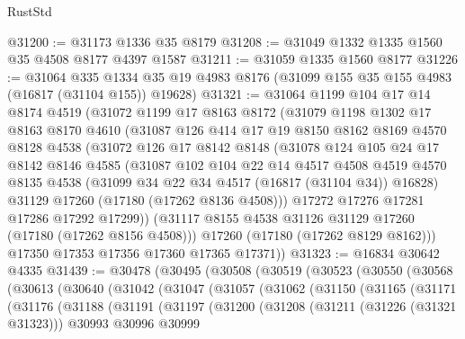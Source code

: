 \begin{lexlean}{RustStd}
\begin{coremodule}
{\begin{coremodule}
{{{{{{{{{{{{{{{{{{{{{{{{{{{{{{{{{{{{{{{{{{{{{{{{{{{{{{{@31200 := @31173 @1336 @35 @8179
@31208 := @31049 @1332 @1335 @1560 @35 @4508 @8177 @4397 @1587
@31211 := @31059 @1335 @1560 @8177
@31226 := @31064
    @335
    @1334
    @35
    @19
    @4983
    @8176
    (@31099 @155 @35 @155 @4983 (@16817 (@31104 @155)) @19628)
@31321 := @31064
    @1199
    @104
    @17
    @14
    @8174
    @4519
    (@31072
      @1199
      @17
      @8163
      @8172
      (@31079
        @1198
        @1302
        @17
        @8163
        @8170
        @4610
        (@31087
          @126
          @414
          @17
          @19
          @8150
          @8162
          @8169
          @4570
          @8128
          @4538
          (@31072
            @126
            @17
            @8142
            @8148
            (@31078
              @124
              @105
              @24
              @17
              @8142
              @8146
              @4585
              (@31087
                @102
                @104
                @22
                @14
                @4517
                @4508
                @4519
                @4570
                @8135
                @4538
                (@31099 @34 @22 @34 @4517 (@16817 (@31104 @34)) @16828)
                @31129
                @17260
                (@17180 (@17262 @8136 @4508)))
              @17272
              @17276
              @17281
              @17286
              @17292
              @17299))
          (@31117 @8155 @4538 @31126 @31129 @17260 (@17180 (@17262 @8156 @4508)))
          @17260
          (@17180 (@17262 @8129 @8162)))
        @17350
        @17353
        @17356
        @17360
        @17365
        @17371))
@31323 := @16834 @30642 @4335
@31439 := @30478
    (@30495
      (@30508
        (@30519
          (@30523
            (@30550
              (@30568
                (@30613
                  (@30640
                    (@31042
                      (@31047
                        (@31057
                          (@31062
                            (@31150
                              (@31165
                                (@31171
                                  (@31176
                                    (@31188
                                      (@31191
                                        (@31197
                                          (@31200
                                            (@31208
                                              (@31211 (@31226 (@31321 @31323)))
                                              @30993
                                              @30996
                                              @30999
}}}}}}}}}}}}}}}}}}}}}}}}}}}}}}}}}}}}}}}}}}}}}}}}}}}}}}}
\end{coremodule}}
\end{coremodule}
\end{lexlean}
